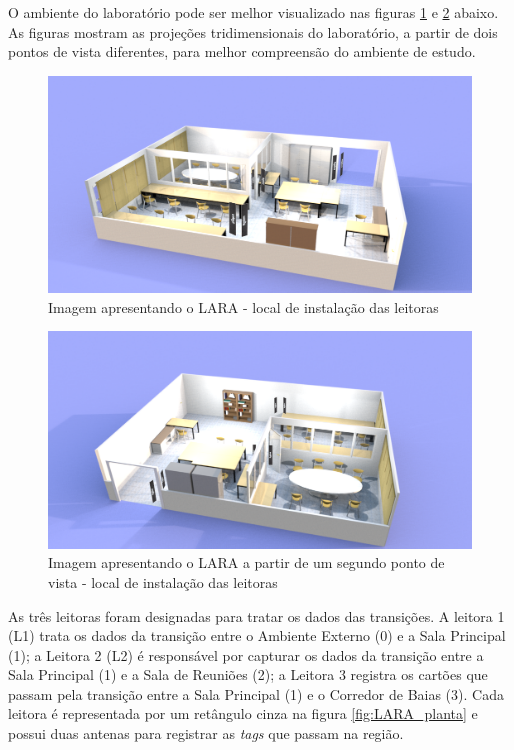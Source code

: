 O ambiente do laboratório pode ser melhor visualizado nas figuras \ref{fig:LARA1} e \ref{fig:LARA2} abaixo. As figuras mostram as projeções tridimensionais do laboratório, a partir de dois pontos de vista diferentes, para melhor compreensão do ambiente de estudo.

  \begin{figure}[H]
    \centering
    \includegraphics[width=1\linewidth]{figs/Metodologia/LARA_leitoras-1.png}
    \caption{Imagem apresentando o LARA - local de instalação das leitoras}
    \label{fig:LARA1}
\end{figure}

  \begin{figure}[H]
    \centering
    \includegraphics[width=1\linewidth]{figs/Metodologia/LARA_leitoras-2.png}
    \caption{Imagem apresentando o LARA a partir de um segundo ponto de vista - local de instalação das leitoras}
    \label{fig:LARA2}
\end{figure}

As três leitoras foram designadas para tratar os dados das transições. A leitora 1 (L1) trata os dados da transição entre o Ambiente Externo (0) e a Sala Principal (1); a Leitora 2 (L2) é responsável por capturar os dados da transição entre a Sala Principal (1) e a Sala de Reuniões (2); a Leitora 3 registra os cartões que passam pela transição entre a Sala Principal (1) e o Corredor de Baias (3). Cada leitora é representada por um retângulo cinza na figura \ref{fig:LARA_planta} e possui duas antenas para registrar as \textit{tags} que passam na região.

